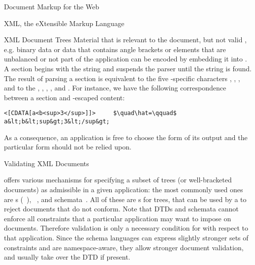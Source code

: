 \begin{omgroup}[id=markup-web]{Document Markup for the Web}
\begin{omgroup}[id=xml]{XML, the eXtensible Markup Language}
\begin{omgroup}[id=xml-tree]{XML Document Trees}
Material that is relevant to the document, but not valid {\xml}, e.g.  binary data or data
that contains angle brackets or elements that are unbalanced or not part of the {\xml}
application can be encoded by embedding it into . A {} section begins with the
string {\snippet{<[CDATA[}} and suspends the {\xml} parser until the string
{\snippet{]]>}} is found. The result of parsing a {} section is equivalent
to  the five {\xml}-specific characters {\snippet{<}},
{\snippet{>}} {}, {}, and {\snippet{\&}} to the  {}, {}, {},
{}, and {}.  For instance, we have the following
correspondence between a {} section and {\xml}-escaped content:
\begin{lstlisting}[mathescape]
<[CDATA[a<b<sup>3</sup>]]>     $\quad\hat=\qquad$     a&lt;b&lt;sup&gt;3&lt;/sup&gt;
\end{lstlisting}
As a consequence, an {\xml} application is free to choose the form of its output and the
particular form should not be relied upon.
\end{omgroup}

\begin{omgroup}[id=xml-validation]{Validating XML Documents}

  {\xml} offers various mechanisms for specifying a subset of trees (or well-bracketed
  {\xml} documents) as admissible in a given {\xml} application: the most commonly used
  ones are {s} ({}~\cite{Bray:XML97}),
  ~\cite{XML:Schema}, and {\relaxng}
  schemata~\cite{Vlist:rng03}. All of these are {s} for
  trees, that can be used by a {} to reject {\xml} documents
  that do not conform.  Note that DTDs and schemata cannot enforce all constraints that a
  particular {\xml} application may want to impose on documents.  Therefore validation is
  only a necessary condition for {} with respect to that application.
  Since the {\xml} schema languages can express slightly stronger sets of constraints and
  are namespace-aware, they allow stronger document validation, and usually take
  {} over the DTD if present.


\end{omgroup}
\end{omgroup}
\end{omgroup}
